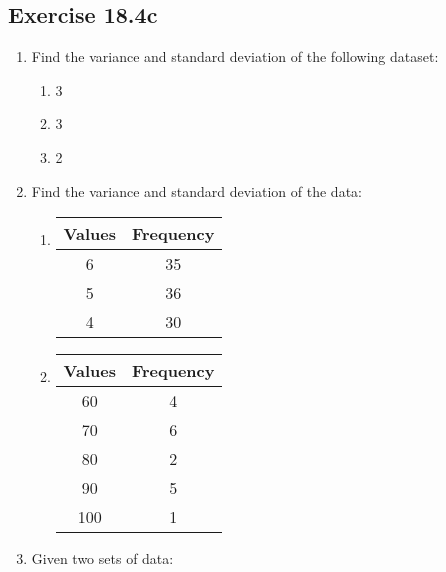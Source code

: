 \documentclass{report}
\begin{document}
\begin{multicols}{2}
\begin{enumerate}
  \end{enumerate}

  \subsection{Exercise 18.4c}

  \begin{enumerate}
    \item Find the variance and standard deviation of the following dataset:
          \begin{enumerate}
            \item 3   
            \item 3    
            \item 2       
          \end{enumerate}
    \item Find the variance and standard deviation of the data:
          \begin{enumerate}
            \item \begin{tabular}{|c|c|}
                    \hline
                    Values & Frequency \\
                    \hline
                    6      & 35        \\
                    5      & 36        \\
                    4      & 30        \\
                    \hline
                  \end{tabular}
            \item \begin{tabular}{|c|c|}
                    \hline
                    Values & Frequency \\
                    \hline
                    60     & 4         \\
                    70     & 6         \\
                    80     & 2         \\
                    90     & 5         \\
                    100    & 1         \\
                    \hline
                  \end{tabular}
          \end{enumerate}
    \item Given two sets of data:

\end{enumerate}
\end{multicols}
\end{document}

